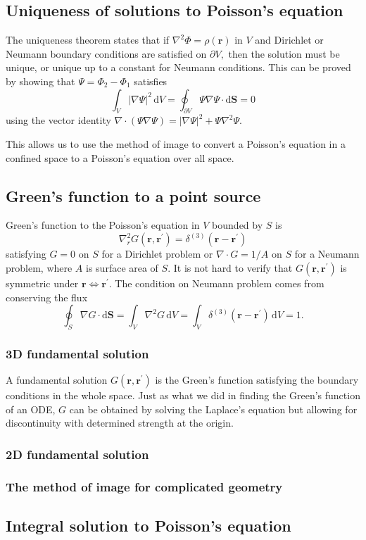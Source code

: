 \documentclass{article}
\begin{document}
\subsection{Uniqueness of solutions to Poisson's equation} 
The uniqueness theorem states that if $\nabla^{2} \Phi = \rho(\mathbf{r})$ in $V$ and Dirichlet or Neumann boundary conditions are satisfied on $\partial V,$ then the solution must be unique, or unique up to a constant for Neumann conditions. This can be proved by showing that $\Psi = \Phi_2 - \Phi_1 $ satisfies 
\[
\int_{V}^{} \left\vert \nabla \Psi  \right\vert ^{2}  \,\mathrm{d}V  = 
    \oint_{\partial V} \Psi \nabla \Psi \cdot \mathrm{d}\mathbf{S} = 0
\]
using the vector identity $\boxed{\nabla\cdot(\Psi \nabla \Psi) = \left\vert \nabla \Psi  \right\vert ^{2} + \Psi \nabla ^{2} \Psi}. $ 

This allows us to use the method of image to convert a Poisson's equation in a confined space to a Poisson's equation over all space. 
\subsection{Green's function to a point source}
Green's function to the Poisson's equation in $V$ bounded by $S$ is 
\[
    \boxed{
        \nabla_r ^{2} G(\mathbf{r}, \mathbf{r^\prime }) = \delta^{(3)}(\mathbf{r}-\mathbf{r^\prime })
    }
\]
satisfying $\boxed{G = 0 \text{ on } S}$ for a Dirichlet problem or $\boxed{\nabla \cdot G = 1/A \text{ on } S}$ for a Neumann problem, where $A$ is surface area of $S$. It is not hard to verify that $G(\mathbf{r}, \mathbf{r^\prime } )$ is symmetric under $\mathbf{r}  \Leftrightarrow \mathbf{r^\prime }.$ The condition on Neumann problem comes from conserving the flux 
\[
    \oint_S \nabla G \cdot \mathrm{d}\mathbf{S} = \int_{V}^{} \nabla ^{2} G \,\mathrm{d}V = \int_{V}^{} \delta^{(3)}(\mathbf{r}-\mathbf{r^\prime }) \,\mathrm{d}V=1. 
\]
\subsubsection{3D fundamental solution}
A fundamental solution $G(\mathbf{r}, \mathbf{r^\prime })$ is the Green's function satisfying the boundary conditions in the whole space. Just as what we did in finding the Green's function of an ODE, $G$ can be obtained by solving the Laplace's equation but allowing for discontinuity with determined strength at the origin. 
\subsubsection{2D fundamental solution}
\subsubsection{The method of image for complicated geometry}
\subsection{Integral solution to Poisson's equation}
\end{document}
